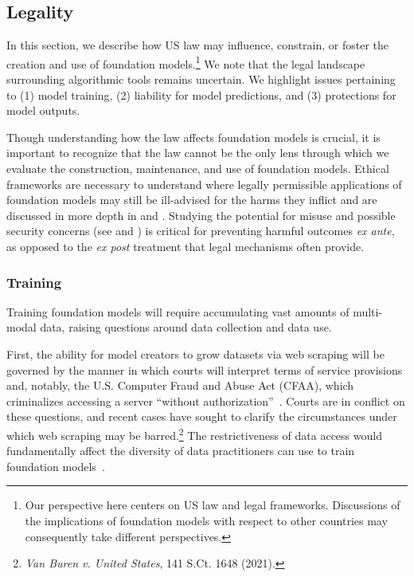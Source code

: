 \newsection
\subsection{Legality}
\label{sec:legality}

In this section, we describe how US law may influence, constrain, or foster the creation and use of foundation models.\footnote{Our perspective here centers on US law and legal frameworks. Discussions of the implications of foundation models with respect to other countries may consequently take different perspectives.} We note that the legal landscape surrounding algorithmic tools remains uncertain. We highlight issues pertaining to (1) model training, (2) liability for model predictions, and (3) protections for model outputs. 


Though understanding how the law affects foundation models is crucial, it is important to recognize that the law cannot be the only lens through which we evaluate the construction, maintenance, and use of foundation models. Ethical frameworks are necessary to understand where legally permissible applications of foundation models may still be ill-advised for the harms they inflict and are discussed in more depth in  and . Studying the potential for misuse and possible security concerns (see  and ) is critical for preventing harmful outcomes \textit{ex ante}, as opposed to the \textit{ex post} treatment that legal mechanisms often provide.

\subsubsection{Training}
Training foundation models will require accumulating vast amounts of multi-modal data, raising questions around data collection and data use. 

First, the ability for model creators to grow datasets via web scraping will be governed by the manner in which courts will interpret terms of service provisions and, notably, the U.S.  Computer Fraud and Abuse Act (CFAA), which criminalizes accessing a server ``without authorization''~\citep{cfaa}. Courts are in conflict on these questions, and recent cases have sought to clarify the circumstances under which web scraping may be barred.\footnote{\textit{Van Buren v. United States}, 141 S.Ct. 1648 (2021).} The restrictiveness of data access would fundamentally affect the diversity of data practitioners can use to train foundation models~\citep{levendowski2018copyright}.

